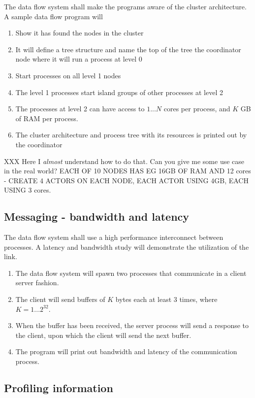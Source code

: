 \documentclass[11pt,a4paper]{article}
\begin{document}
The data flow system shall make the programs aware of the cluster architecture.  A sample data flow program will

\begin{enumerate}
    \item Show it has found the nodes in the cluster
    \item It will define a tree structure and name the top of the tree the coordinator node where it will run a process at level 0
    \item Start processes on all level 1 nodes
    \item The level 1 processes start island groups of other processes at level 2
    \item The processes at level 2 can have access to $1...N$ cores per process, and $K$ GB of RAM per process. 
    \item The cluster architecture and process tree with its resources is printed out by the coordinator
\end{enumerate}

XXX Here I \textit{almost} understand how to do that. Can you give me some use case in the real world?  EACH OF 10 NODES HAS EG 16GB OF RAM AND 12 cores - CREATE 4 ACTORS ON EACH NODE, EACH ACTOR USING 4GB, EACH USING 3 cores.

\subsection{Messaging - bandwidth and latency}

The data flow system shall use a high performance interconnect between processes.  A latency and bandwidth study will demonstrate the utilization of the link.

\begin{enumerate}
    \item The data flow system will spawn two processes that communicate in a client server fashion.  
    \item The client will send buffers of $K$ bytes each at least 3 times, where $K=1...2^{32}$.  
    \item When the buffer has been received, the server process will send a response to the client, upon which the client will send the next buffer.
    \item The program will print out bandwidth and latency of the communication process.
\end{enumerate}



\subsection{Profiling information}
\end{document}
